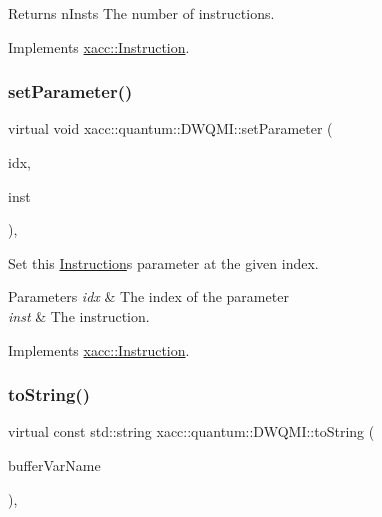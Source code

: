 \begin{DoxyReturn}{Returns}
n\+Insts The number of instructions. 
\end{DoxyReturn}


Implements \hyperlink{a01657_ad54585d13c04ffd20296fff7ab8107ff}{xacc\+::\+Instruction}.

\mbox{\label{a01225_a194b5b9f58262774fde0285f4c3f60af}} 
\subsubsection{\texorpdfstring{set\+Parameter()}{setParameter()}}
{\footnotesize\ttfamily virtual void xacc\+::quantum\+::\+D\+W\+Q\+M\+I\+::set\+Parameter (\begin{DoxyParamCaption}\item[{const int}]{idx,  }\item[{Instruction\+Parameter \&}]{inst }\end{DoxyParamCaption})\hspace{0.3cm}{\ttfamily [inline]}, {\ttfamily [virtual]}}

Set this \hyperlink{a01657}{Instruction}\textquotesingle{}s parameter at the given index.


\begin{DoxyParams}{Parameters}
{\em idx} & The index of the parameter \\
\hline
{\em inst} & The instruction. \\
\hline
\end{DoxyParams}


Implements \hyperlink{a01657_a407a0ac662fa0b1ec3e301e8ff9bade7}{xacc\+::\+Instruction}.

\mbox{\label{a01225_a8d8742bb6743cf6e49f95966d05bbec2}} 
\subsubsection{\texorpdfstring{to\+String()}{toString()}}
{\footnotesize\ttfamily virtual const std\+::string xacc\+::quantum\+::\+D\+W\+Q\+M\+I\+::to\+String (\begin{DoxyParamCaption}\item[{const std\+::string \&}]{buffer\+Var\+Name }\end{DoxyParamCaption})\hspace{0.3cm}{\ttfamily [inline]}, {\ttfamily [virtual]}}

